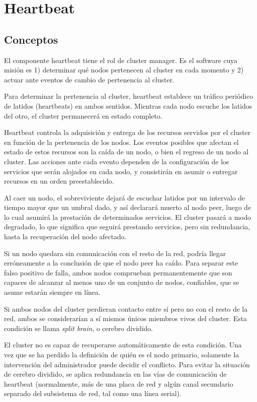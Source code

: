 

\section{Heartbeat}


\subsection{Conceptos}
El componente heartbeat tiene el rol de cluster manager. Es el software cuya misión es 1) determinar qué nodos pertenecen al cluster en cada momento y 2) actuar ante eventos de cambio de pertenencia al cluster. 

Para determinar la pertenencia al cluster, heartbeat establece un tráfico periódico de latidos (heartbeats) en ambos sentidos. Mientras cada nodo escuche los latidos del otro, el cluster permanecerá en estado completo. 

Heartbeat controla la adquisición y entrega de los recursos servidos por el cluster en función de la pertenencia de los nodos. Los eventos posibles que afectan el estado de estos recursos son la caída de un nodo, o bien el regreso de un nodo al cluster. Las acciones ante cada evento dependen de la configuración de los servicios que serán alojados en cada nodo, y consistirán en asumir o entregar recursos en un orden preestablecido. 

Al caer un nodo, el sobreviviente dejará de escuchar latidos por un intervalo de tiempo mayor que un umbral dado, y así declarará muerto al nodo peer, luego de lo cual asumirá la prestación de determinados servicios. El cluster pasará a modo degradado, lo que significa que seguirá prestando servicios, pero sin redundancia, hasta la recuperación del nodo afectado.

Si un nodo quedara sin comunicación con el resto de la red, podría llegar erróneamente a la conclusión de que el nodo peer ha caído. Para separar este falso positivo de falla, ambos nodos comprueban permanentemente que son capaces de alcanzar al menos uno de un conjunto de nodos, confiables, que se asume estarán siempre en línea.

Si ambos nodos del cluster perdieran contacto entre sí pero no con el resto de la red, ambos se considerarían a sí mismos únicos miembros vivos del cluster. Esta condición se llama \emph{split brain}, o cerebro dividido. 

El cluster no es capaz de recuperarse automáticamente de esta condición. Una vez que se ha perdido la definición de quién es el nodo primario, solamente la intervención del administrador puede decidir el conflicto. Para evitar la situación de cerebro dividido, se aplica redundancia en las vías de comunicación de heartbeat (normalmente, más de una placa de red y algún canal secundario separado del subsistema de red, tal como una línea serial).

